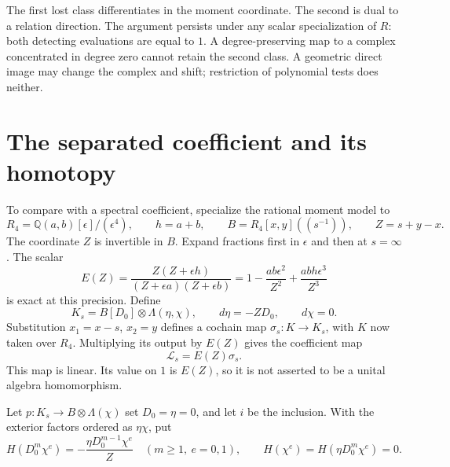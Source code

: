 The first lost class differentiates in the moment coordinate.
The second is dual to a relation direction. The argument persists
under any scalar specialization of $R$: both detecting evaluations
are equal to $1$. A degree-preserving map to a complex concentrated
in degree zero cannot retain the second class. A geometric direct
image may change the complex and shift; restriction of polynomial
tests does neither.

\section{The separated coefficient and its homotopy}
\label{cycoll:sec:separated}

To compare with a spectral coefficient, specialize the rational
moment model to
\[
 R_4=\mathbb Q(a,b)[\epsilon]/(\epsilon^4),\qquad h=a+b,
 \qquad B=R_4[x,y]((s^{-1})),\qquad Z=s+y-x.
\]
The coordinate $Z$ is invertible in $B$. Expand fractions first
in $\epsilon$ and then at $s=\infty$. The scalar
\begin{equation}\label{cycoll:eq:euler}
 E(Z)=\frac{Z(Z+\epsilon h)}{(Z+\epsilon a)(Z+\epsilon b)}
      =1-\frac{ab\epsilon^2}{Z^2}
           +\frac{abh\epsilon^3}{Z^3}
\end{equation}
is exact at this precision. Define
\[
 K_s=B[D_0]\otimes\Lambda(\eta,\chi),\qquad
 d\eta=-ZD_0,\qquad d\chi=0.
\]
Substitution $x_1=x-s$, $x_2=y$ defines a cochain map
$\sigma_s:K\to K_s$, with $K$ now taken over $R_4$.
Multiplying its output by $E(Z)$ gives the coefficient map
\begin{equation}\label{cycoll:eq:lift}
 \mathcal L_s=E(Z)\sigma_s.
\end{equation}
This map is linear. Its value on $1$ is $E(Z)$, so it is not
asserted to be a unital algebra homomorphism.

Let $p:K_s\to B\otimes\Lambda(\chi)$ set $D_0=\eta=0$,
and let $i$ be the inclusion. With the exterior factors ordered
as $\eta\chi$, put
\begin{equation}\label{cycoll:eq:homotopy}
 H(D_0^m\chi^e)=-\frac{\eta D_0^{m-1}\chi^e}{Z}
 \quad(m\geq1,\ e=0,1),\qquad
 H(\chi^e)=H(\eta D_0^m\chi^e)=0.
\end{equation}

